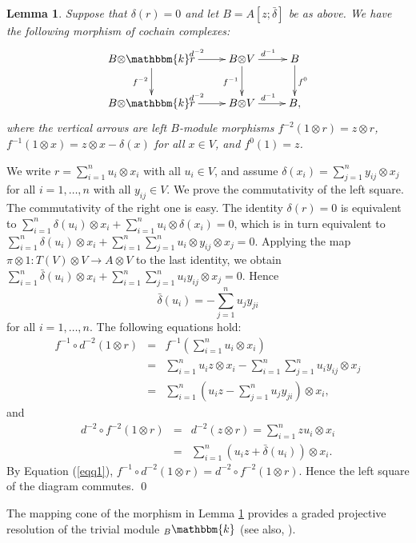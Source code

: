 \documentclass[a4paper]{amsart}
\newtheorem{lem}[thm]{Lemma}
\begin{document}
\begin{lem}\label{lemr1} Suppose that $\delta(r)=0$ and let $B=A[z;\bar{\delta}]$ be as above. We have the following morphism of cochain complexes:
$$\xymatrix{B{\otimes} {\mathbbm{k}} r\ar[r]^{d^{-2}}\ar[d]_{f^{-2}} &B{\otimes} V\ar[d]_{f^{-1}}\ar[r]^{d^{-1}}&B\ar[d]^{f^{0}}\\
 B{\otimes} {\mathbbm{k}} r\ar[r]^{d^{-2}} & B{\otimes} V\ar[r]^{d^{-1}}& B,
}$$ where the vertical arrows are left $B$-module morphisms $f^{-2}(1{\otimes} r)=z{\otimes} r$, $f^{-1}(1{\otimes} x)=z{\otimes} x-\delta(x)$ for all $x\in V$, and $f^{0}(1)=z$.
\end{lem}
\proof We write $r=\sum_{i=1}^nu_i{\otimes} x_i$ with all $u_i\in V$, and assume $\delta(x_i)=\sum_{j=1}^n y_{ij}{\otimes} x_j$ for all $i=1,\dots,n$ with all $y_{ij}\in V$. We prove the commutativity of the left square. The commutativity of the right one is easy. The identity $\delta(r)=0$ is equivalent to $\sum_{i=1}^n\delta(u_i){\otimes} x_i+\sum_{i=1}^n u_i{\otimes} \delta(x_i)=0$, which is in turn equivalent to $\sum_{i=1}^n\delta(u_i){\otimes} x_i+\sum_{i=1}^n \sum_{j=1}^nu_i{\otimes} y_{ij}{\otimes} x_j=0$. Applying the map $\pi{\otimes} 1:T(V){\otimes} V\to A{\otimes} V$ to the last identity, we obtain $\sum_{i=1}^n\bar{\delta}(u_i){\otimes} x_i+\sum_{i=1}^n \sum_{j=1}^nu_iy_{ij}{\otimes} x_j=0$. Hence
\begin{equation}\label{eqq1}
    \bar{\delta}(u_i)=-\sum_{j=1}^nu_jy_{ji}
\end{equation}
for all $i=1,\dots,n$. The following equations hold:
\begin{eqnarray}
 \nonumber f^{-1}\circ d^{-2}(1{\otimes} r)&=&f^{-1}(\sum_{i=1}^nu_i{\otimes} x_i) \\
  \nonumber &=& \sum_{i=1}^nu_iz{\otimes} x_i- \sum_{i=1}^n\sum_{j=1}^n u_i y_{ij}{\otimes} x_j\\
 \nonumber &=& \sum_{i=1}^n(u_i z- \sum_{j=1}^n u_j y_{ji}){\otimes} x_i,
\end{eqnarray}
and
\begin{eqnarray}
  \nonumber d^{-2}\circ f^{-2}(1{\otimes} r) &=& d^{-2}(z{\otimes} r)= \sum_{i=1}^nzu_i{\otimes} x_i\\
  \nonumber &=& \sum_{i=1}^n(u_i z+\bar{\delta}(u_i)){\otimes} x_i.
\end{eqnarray} By Equation (\ref{eqq1}), $f^{-1}\circ d^{-2}(1{\otimes} r)=d^{-2}\circ f^{-2}(1{\otimes} r)$. Hence the left square of the diagram commutes.
\qed

The mapping cone of the morphism in Lemma \ref{lemr1} provides a graded projective resolution of the trivial module ${}_B{\mathbbm{k}}$ (see also, \cite{GS,P}).
\end{document}
